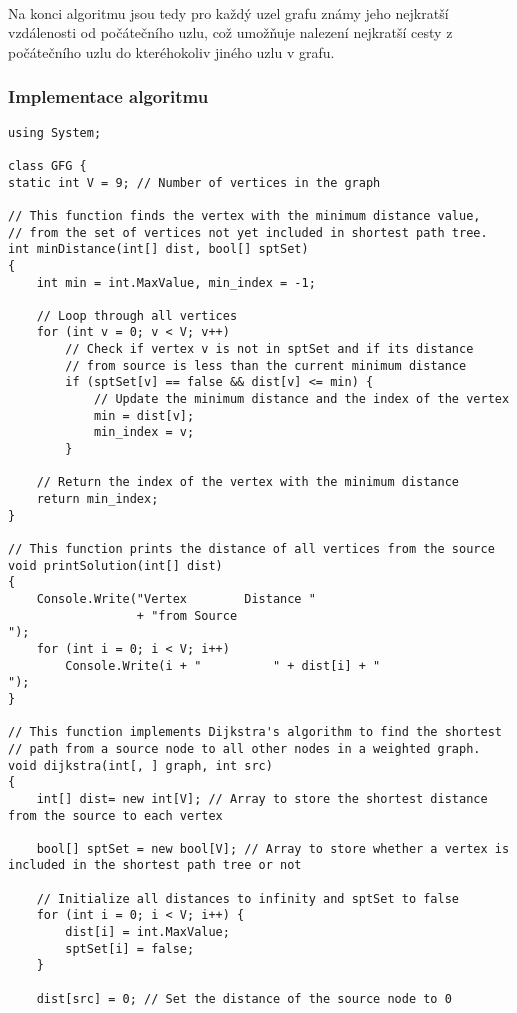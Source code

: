 \documentclass[12pt]{article}
\begin{document}
\paragraph{}
Na konci algoritmu jsou tedy pro každý uzel grafu známy jeho nejkratší vzdálenosti od 
počátečního uzlu, což umožňuje nalezení nejkratší cesty z počátečního uzlu do kteréhokoliv 
jiného uzlu v grafu.
\subsubsection{Implementace algoritmu}
\begin{lstlisting}
using System;

class GFG {
static int V = 9; // Number of vertices in the graph

// This function finds the vertex with the minimum distance value,
// from the set of vertices not yet included in shortest path tree.
int minDistance(int[] dist, bool[] sptSet)
{
    int min = int.MaxValue, min_index = -1;

    // Loop through all vertices
    for (int v = 0; v < V; v++)
        // Check if vertex v is not in sptSet and if its distance
        // from source is less than the current minimum distance
        if (sptSet[v] == false && dist[v] <= min) {
            // Update the minimum distance and the index of the vertex
            min = dist[v];
            min_index = v;
        }

    // Return the index of the vertex with the minimum distance
    return min_index;
}

// This function prints the distance of all vertices from the source
void printSolution(int[] dist)
{
    Console.Write("Vertex 		 Distance "
                  + "from Source
");
    for (int i = 0; i < V; i++)
        Console.Write(i + " 		 " + dist[i] + "
");
}

// This function implements Dijkstra's algorithm to find the shortest
// path from a source node to all other nodes in a weighted graph.
void dijkstra(int[, ] graph, int src)
{
    int[] dist= new int[V]; // Array to store the shortest distance from the source to each vertex

    bool[] sptSet = new bool[V]; // Array to store whether a vertex is included in the shortest path tree or not

    // Initialize all distances to infinity and sptSet to false
    for (int i = 0; i < V; i++) {
        dist[i] = int.MaxValue;
        sptSet[i] = false;
    }

    dist[src] = 0; // Set the distance of the source node to 0


\end{lstlisting}
\end{document}
